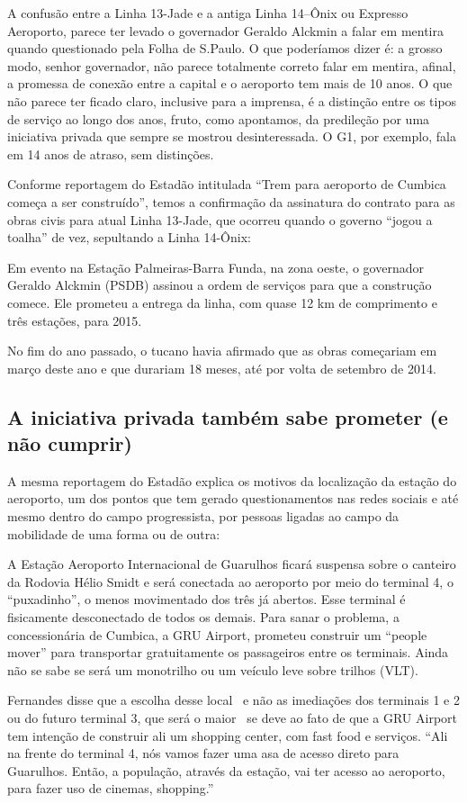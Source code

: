 \documentclass[11pt,fleqn]{book} %
\begin{document}
A confusão entre a Linha 13-Jade e a antiga Linha 14–Ônix ou Expresso Aeroporto, parece ter levado o governador Geraldo Alckmin a falar em mentira quando questionado pela Folha de S.Paulo. O que poderíamos dizer é: a grosso modo, senhor governador, não parece totalmente correto falar em mentira, afinal, a promessa de conexão entre a capital e o aeroporto tem mais de 10 anos. O que não parece ter ficado claro, inclusive para a imprensa, é a distinção entre os tipos de serviço ao longo dos anos, fruto, como apontamos, da predileção por uma iniciativa privada que sempre se mostrou desinteressada. O G1, por exemplo, fala em 14 anos de atraso, sem distinções.

Conforme reportagem do Estadão intitulada “Trem para aeroporto de Cumbica começa a ser construído”, temos a confirmação da assinatura do contrato para as obras civis para atual Linha 13-Jade, que ocorreu quando o governo “jogou a toalha” de vez, sepultando a Linha 14-Ônix:

\begin{citacao}
	Em evento na Estação Palmeiras-Barra Funda, na zona oeste, o governador Geraldo Alckmin (PSDB) assinou a ordem de serviços para que a construção comece. Ele prometeu a entrega da linha, com quase 12 km de comprimento e três estações, para 2015.
	
	No fim do ano passado, o tucano havia afirmado que as obras começariam em março deste ano e que durariam 18 meses, até por volta de setembro de 2014.
\end{citacao}

\subsection{A iniciativa privada também sabe prometer (e não cumprir)}

A mesma reportagem do Estadão explica os motivos da localização da estação do aeroporto, um dos pontos que tem gerado questionamentos nas redes sociais e até mesmo dentro do campo progressista, por pessoas ligadas ao campo da mobilidade de uma forma ou de outra:

\begin{citacao}
	A Estação Aeroporto Internacional de Guarulhos ficará suspensa sobre o canteiro da Rodovia Hélio Smidt e será conectada ao aeroporto por meio do terminal 4, o “puxadinho”, o menos movimentado dos três já abertos. Esse terminal é fisicamente desconectado de todos os demais. Para sanar o problema, a concessionária de Cumbica, a GRU Airport, prometeu construir um “people mover” para transportar gratuitamente os passageiros entre os terminais. Ainda não se sabe se será um monotrilho ou um veículo leve sobre trilhos (VLT).
	
	Fernandes disse que a escolha desse local \textemdash\ e não as imediações dos terminais 1 e 2 ou do futuro terminal 3, que será o maior \textemdash\ se deve ao fato de que a GRU Airport tem intenção de construir ali um shopping center, com fast food e serviços. “Ali na frente do terminal 4, nós vamos fazer uma asa de acesso direto para Guarulhos. Então, a população, através da estação, vai ter acesso ao aeroporto, para fazer uso de cinemas, shopping.”
\end{citacao}
\end{document}
